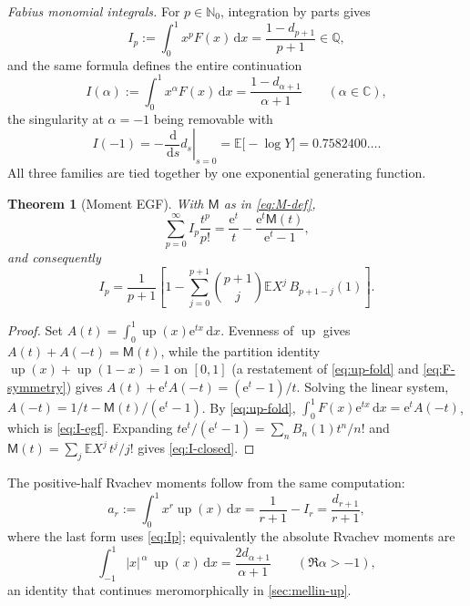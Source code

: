 \documentclass[11pt,oneside]{article}
\numberwithin{equation}{section}
\newtheorem{theorem}{Theorem}[section]
\theoremstyle{definition}
\theoremstyle{remark}
\newcommand{\C}{\mathbb C}
\newcommand{\Q}{\mathbb Q}
\newcommand{\N}{\mathbb N}
\newcommand{\E}{\mathbb E}
\newcommand{\dd}{\,\mathrm d}
\newcommand{\e}{\mathrm e}
\newcommand{\Up}{\operatorname{up}}
\newcommand{\abs}[1]{\left\lvert #1\right\rvert}
\newcommand{\MM}{\mathsf M}
\begin{document}
\emph{Fabius monomial integrals.}  For $p\in\N_0$, integration by parts
gives
\begin{equation}
 I_p:=\int_0^1x^pF(x)\dd x
 =\frac{1-d_{p+1}}{p+1}\in\Q,
 \label{eq:Ip}
\end{equation}
and the same formula defines the entire continuation
\begin{equation}
 I(\alpha):=\int_0^1x^\alpha F(x)\dd x
 =\frac{1-d_{\alpha+1}}{\alpha+1}
 \qquad(\alpha\in\C),
 \label{eq:Ialpha}
\end{equation}
the singularity at $\alpha=-1$ being removable with
\begin{equation}
 I(-1)=-\left.\frac{\dd}{\dd s}d_s\right|_{s=0}
 =\E\bigl[-\log Y\bigr]
 =0.7582400\ldots.
 \label{eq:Iminus1}
\end{equation}
All three families are tied together by one exponential generating
function.

\begin{theorem}[Moment EGF]
\label{thm:moment-egf}
With $\MM$ as in \eqref{eq:M-def},
\begin{equation}
 \sum_{p=0}^{\infty}I_p\frac{t^p}{p!}
 =\frac{\e^{t}}{t}-\frac{\e^{t}\MM(t)}{\e^{t}-1},
 \label{eq:I-egf}
\end{equation}
and consequently
\begin{equation}
 I_p=\frac1{p+1}\left[
 1-\sum_{j=0}^{p+1}\binom{p+1}{j}\E X^{j}\,B_{p+1-j}(1)
 \right].
 \label{eq:I-closed}
\end{equation}
\end{theorem}

\begin{proof}
Set $A(t)=\int_0^1\Up(x)\e^{tx}\dd x$.  Evenness of $\Up$ gives
$A(t)+A(-t)=\MM(t)$, while the partition identity
$\Up(x)+\Up(1-x)=1$ on $[0,1]$ (a restatement of
\eqref{eq:up-fold} and \eqref{eq:F-symmetry}) gives
$A(t)+\e^{t}A(-t)=(\e^{t}-1)/t$.  Solving the linear system,
$A(-t)=1/t-\MM(t)/(\e^{t}-1)$.  By \eqref{eq:up-fold},
$\int_0^1F(x)\e^{tx}\dd x=\e^{t}A(-t)$, which is \eqref{eq:I-egf}.
Expanding $t\e^{t}/(\e^{t}-1)=\sum_nB_n(1)t^n/n!$ and
$\MM(t)=\sum_j\E X^j\,t^j/j!$ gives \eqref{eq:I-closed}.
\end{proof}

The positive-half Rvachev moments follow from the same computation:
\begin{equation}
 a_r:=\int_0^1x^r\Up(x)\dd x
 =\frac1{r+1}-I_r
 =\frac{d_{r+1}}{r+1},
 \label{eq:a-r}
\end{equation}
where the last form uses \eqref{eq:Ip}; equivalently the absolute
Rvachev moments are
\begin{equation}
 \int_{-1}^{1}\abs x^{\,\alpha}\,\Up(x)\dd x
 =\frac{2d_{\alpha+1}}{\alpha+1}
 \qquad(\Re\alpha>-1),
 \label{eq:absolute-continuous}
\end{equation}
an identity that continues meromorphically in \cref{sec:mellin-up}.
\end{document}
